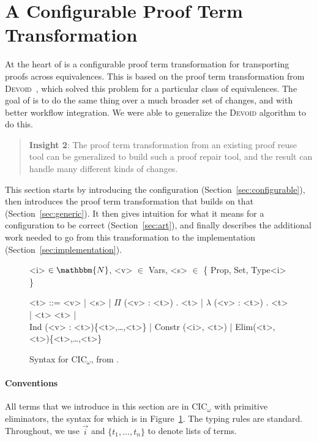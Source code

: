 \section{A Configurable Proof Term Transformation}
\label{sec:key2}

At the heart of \toolname is a configurable proof term transformation for transporting
proofs across equivalences. This is based on the proof term transformation from 
\textsc{Devoid}~\cite{Ringer2019}, which solved this problem for a particular class of equivalences.
The goal of \toolname is to do the same thing over a much broader set of changes, and with better workflow integration.
We were able to generalize the \textsc{Devoid} algorithm to do this.

\begin{quote}
\textbf{Insight 2}:
The proof term transformation from an existing proof reuse tool can be generalized
to build such a proof repair tool, and the result can handle 
many different kinds of changes.
\end{quote}

This section starts by introducing the configuration (Section~\ref{sec:configurable}),
then introduces the proof term transformation that builds on that (Section~\ref{sec:generic}).
It then gives intuition for what it means for a configuration to be correct (Section~\ref{sec:art}),
and finally describes the additional work needed to go from this transformation to the implementation (Section~\ref{sec:implementation}). 

\begin{figure}
\small
\begin{grammar}
<i> $\in \mathbbm{N}$, <v> $\in$ Vars, <s> $\in$ \{ Prop, Set, Type<i> \}

<t> ::= <v> | <s> | $\Pi$ (<v> : <t>) . <t> | $\lambda$ (<v> : <t>) . <t> | <t> <t> | \\ 
Ind (<v> : <t>)\{<t>,\ldots,<t>\} | Constr (<i>, <t>) | Elim(<t>, <t>)\{<t>,\ldots,<t>\}
\end{grammar}
\vspace{-0.2cm}
\caption{Syntax for CIC$_\omega$, from \citet{Timany2015FirstST}.}
\label{fig:syntax}
\end{figure}

\paragraph{Conventions}
All terms that we introduce in this section are in CIC$_{\omega}$ with primitive eliminators,
the syntax for which is in Figure~\ref{fig:syntax}.
The typing rules are standard.
Throughout, we use $\vec{i}$ and $\{t_1, \ldots, t_n\}$ to denote lists of terms.

